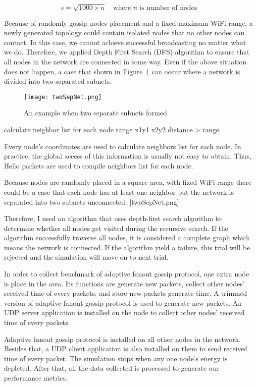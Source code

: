 \[ s=\sqrt{1000\times n} \quad \mbox{where } n \mbox{ is number of nodes}\]

Because of randomly gossip nodes placement and a fixed maximum WiFi range, a newly generated topology could contain isolated nodes that no other nodes can contact. In this case, we cannot achieve successful broadcasting no matter what we do. Therefore, we applied Depth First Search (DFS) algorithm to ensure that all nodes in the network are connected in some way. Even if the above situation does not happen, a case that shown in Figure~\ref{fig:twoSepNet} can occur where a network is divided into two separated subnets.

\begin{figure}
	\centering
	\texttt{[image: twoSepNet.png]}
	\caption{An example when two separate subnets formed}
	\label{fig:twoSepNet}
\end{figure}

calculate neighbor list for each node
range
x1y1
x2y2
distance > range

Every node's coordinates are used to calculate neighbors list for each node. In practice, the global access of this information is usually not easy to obtain. Thus, Hello packets are used to compile neighbors list for each node.

Because nodes are randomly placed in a square area, with fixed WiFi range there could be a case that each node has at least one neighbor but the network is separated into two subnets unconnected. [twoSepNet.png]

Therefore, I used an algorithm that uses depth-first search algorithm to determine whether all nodes get visited during the recursive search. If the algorithm successfully traverse all nodes, it is considered a complete graph which means the network is connected. If the algorithm yield a failure, this trial will be rejected and the simulation will move on to next trial.

In order to collect benchmark of adaptive fanout gossip protocol, one extra node is place in the area. Its functions are generate new packets, collect other nodes' received time of every packets, and store new packets generate time. A trimmed version of adaptive fanout gossip protocol is used to generate new packets. An UDP server application is installed on the node to collect other nodes' received time of every packets.

Adaptive fanout gossip protocol is installed on all other nodes in the network. Besides that, a UDP client application is also installed on them to send received time of every packet. The simulation stops when any one node's energy is depleted. After that, all the data collected is processed to generate our performance metrics. 

